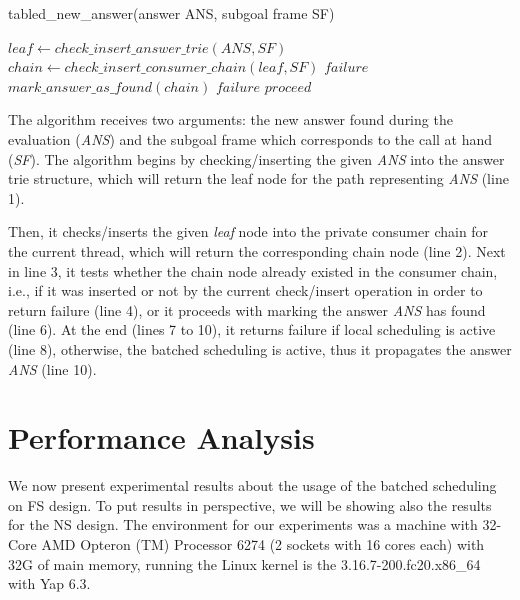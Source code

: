 \documentclass{llncs}
\begin{document}
\begin{algorithm} [!ht]
\caption{tabled\_new\_answer(answer ANS, subgoal frame SF)}
\begin{algorithmic}[1]
  \STATE $leaf \gets check\_insert\_answer\_trie(ANS, SF)$
  \STATE $chain \gets check\_insert\_consumer\_chain(leaf, SF)$
    \RETURN $failure$
    \STATE $mark\_answer\_as\_found(chain)$
      \RETURN $failure$
      \RETURN $proceed$
    \ENDIF
  \ENDIF  
\end{algorithmic}
\label{alg_table_new_answer_batched}
\end{algorithm}

The algorithm receives two arguments: the new answer found during the
evaluation (\emph{ANS}) and the subgoal frame which corresponds to the
call at hand (\emph{SF}). The algorithm begins by checking/inserting
the given \emph{ANS} into the answer trie structure, which will return
the leaf node for the path representing \emph{ANS} (line 1).

Then, it checks/inserts the given \emph{leaf} node into the private
consumer chain for the current thread, which will return the
corresponding chain node (line 2). Next in line 3, it tests whether
the chain node already existed in the consumer chain, i.e., if it was
inserted or not by the current check/insert operation in order to
return failure (line 4), or it proceeds with marking the answer
\emph{ANS} has found (line 6). At the end (lines 7 to 10), it returns
failure if local scheduling is active (line 8), otherwise, the batched
scheduling is active, thus it propagates the answer \emph{ANS} (line
10).

\section{Performance Analysis}

We now present experimental results about the usage of the batched
scheduling on FS design. To put results in perspective, we will be
showing also the results for the NS design. The environment for our
experiments was a machine with 32-Core AMD Opteron (TM) Processor 6274
(2 sockets with 16 cores each) with 32G of main memory, running the
Linux kernel is the 3.16.7-200.fc20.x86\_64 with Yap 6.3.
\end{document}
